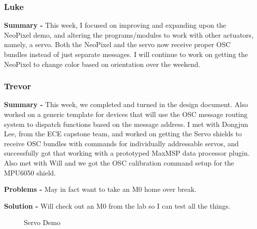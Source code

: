 \documentclass[onecolumn, draftclsnofoot,10pt, compsoc]{IEEEtran}
\begin{document}
\subsubsection*{Luke}
    \begin{adjustwidth}{2.5em}{0pt}
    \textbf{Summary -} This week, I focused on improving and expanding upon the NeoPixel demo, and altering the programs/modules to work with other actuators, namely, a servo. Both the NeoPixel and the servo now receive proper OSC bundles instead of just separate messages. I will continue to work on getting the NeoPixel to change color based on orientation over the weekend.    
    \end{adjustwidth}
\subsubsection*{Trevor}
    \begin{adjustwidth}{2.5em}{0pt}
    \textbf{Summary -} This week, we completed and turned in the design document. Also worked on a generic template for devices that will use the OSC message routing system to dispatch functions based on the message address. I met with Dongjun Lee, from the ECE capstone team, and worked on getting the Servo shields to receive OSC bundles with commands for individually addressable servos, and successfully got that working with a prototyped MaxMSP data processor plugin. Also met with Will and we got the OSC calibration command setup for the MPU6050 shield.
    
    \textbf{Problems -} May in fact want to take an M0 home over break.
    \end{adjustwidth}
    \begin{adjustwidth}{5em}{0pt}
    \textbf{Solution -} Will check out an M0 from the lab so I can test all the things.
    \end{adjustwidth}


    \begin{figure}[H]
        \centering
        \caption{Servo Demo}
        \label{fig:servo_demo}
        \qquad
    \end{figure}
\end{document}
